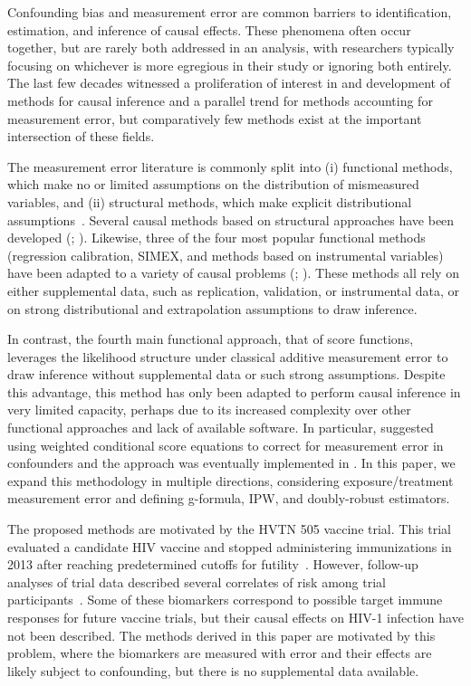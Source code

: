 \documentclass[useAMS,usenatbib,referee]{biom}
\begin{document}
Confounding bias and measurement error are common barriers to identification, estimation, and inference of causal effects. These phenomena often occur together, but are rarely both addressed in an analysis, with researchers typically focusing on whichever is more egregious in their study or ignoring both entirely. The last few decades witnessed a proliferation of interest in and development of methods for causal inference and a parallel trend for methods accounting for measurement error, but comparatively few methods exist at the important intersection of these fields.

The measurement error literature is commonly split into (i) functional methods, which make no or limited assumptions on the distribution of mismeasured variables, and (ii) structural methods, which make explicit distributional assumptions~\citep{carroll2006}. Several causal methods based on structural approaches have been developed (\citealp{kuroki2014,edwards2015multiple,braun2017}; \citealp*{hong2017}). Likewise, three of the four most popular functional methods (regression calibration, SIMEX, and methods based on instrumental variables) have been adapted to a variety of causal problems (\citealp*{vansteelandt2009}; \citealp{cole2010,kendall2015,lockwood2015,kyle2016,wu2019}). These methods all rely on either supplemental data, such as replication, validation, or instrumental data, or on strong distributional and extrapolation assumptions to draw inference.

In contrast, the fourth main functional approach, that of score functions, leverages the likelihood structure under classical additive measurement error to draw inference without supplemental data or such strong assumptions. Despite this advantage, this method has only been adapted to perform causal inference in very limited capacity, perhaps due to its increased complexity over other functional approaches and lack of available software. In particular, \citet*{mccaffrey2013} suggested using weighted conditional score equations to correct for measurement error in confounders and the approach was eventually implemented in \citet{shu2019}. In this paper, we expand this methodology in multiple directions, considering exposure/treatment measurement error and defining g-formula, IPW, and doubly-robust estimators.

The proposed methods are motivated by the HVTN 505 vaccine trial. This trial evaluated a candidate HIV vaccine and stopped administering immunizations in 2013 after reaching predetermined cutoffs for futility~\citep{hammer2013}. However, follow-up analyses of trial data described several correlates of risk among trial participants~\citep{decamp2017,janes2017,fong2018,neidich2019}. Some of these biomarkers correspond to possible target immune responses for future vaccine trials, but their causal effects on HIV-1 infection have not been described. The methods derived in this paper are motivated by this problem, where the biomarkers are measured with error and their effects are likely subject to confounding, but there is no supplemental data available.
\end{document}
